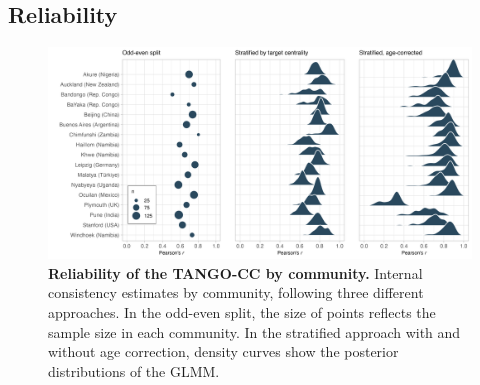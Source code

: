 \documentclass[
  man,floatsintext]{apa7}
\begin{document}
\subsection{Reliability}\label{reliability}



\begin{figure}

{\centering \includegraphics[width=1\linewidth]{../figures/tango-cc-reli} 

}

\caption{\textbf{Reliability of the TANGO-CC by community.} Internal consistency estimates by community, following three different approaches. In the odd-even split, the size of points reflects the sample size in each community. In the stratified approach with and without age correction, density curves show the posterior distributions of the GLMM.}\label{fig:fig4}
\end{figure}
\end{document}
